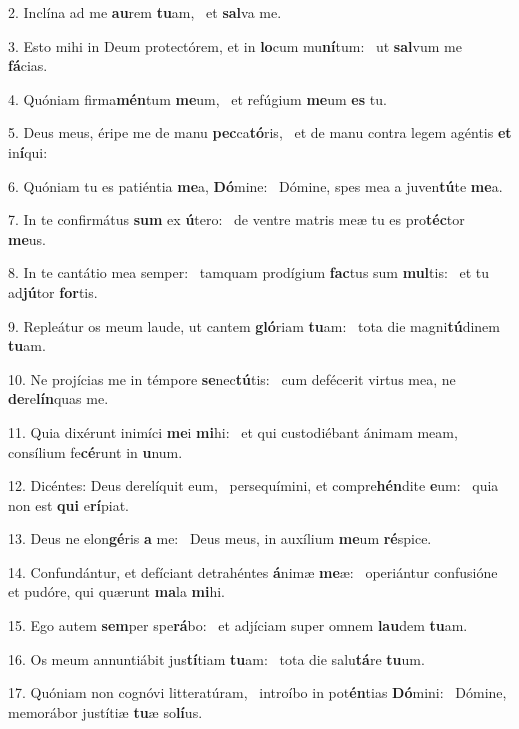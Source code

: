 2. Inclína ad me \textbf{au}rem \textbf{tu}am, \ast\  et \textbf{sal}va me.\

3. Esto mihi in Deum protectórem, et in \textbf{lo}cum mu\textbf{ní}tum: \ast\  ut \textbf{sal}vum me \textbf{fá}cias.\

4. Quóniam firma\textbf{mén}tum \textbf{me}um, \ast\  et refúgium \textbf{me}um \textbf{es} tu.\

5. Deus meus, éripe me de manu \textbf{pec}ca\textbf{tó}ris, \ast\  et de manu contra legem agéntis \textbf{et} in\textbf{í}qui:\

6. Quóniam tu es patiéntia \textbf{me}a, \textbf{Dó}mine: \ast\  Dómine, spes mea a juven\textbf{tú}te \textbf{me}a.\

7. In te confirmátus \textbf{sum} ex \textbf{ú}tero: \ast\  de ventre matris meæ tu es pro\textbf{téc}tor \textbf{me}us.\

8. In te cantátio mea semper: \dag\  tamquam prodígium \textbf{fac}tus sum \textbf{mul}tis: \ast\  et tu ad\textbf{jú}tor \textbf{for}tis.\

9. Repleátur os meum laude, ut cantem \textbf{gló}riam \textbf{tu}am: \ast\  tota die magni\textbf{tú}dinem \textbf{tu}am.\

10. Ne projícias me in témpore \textbf{se}nec\textbf{tú}tis: \ast\  cum defécerit virtus mea, ne \textbf{de}re\textbf{lín}quas me.\

11. Quia dixérunt inimíci \textbf{me}i \textbf{mi}hi: \ast\  et qui custodiébant ánimam meam, consílium fe\textbf{cé}runt in \textbf{u}num.\

12. Dicéntes: Deus derelíquit eum, \dag\  persequímini, et compre\textbf{hén}dite \textbf{e}um: \ast\  quia non est \textbf{qui} e\textbf{rí}piat.\

13. Deus ne elon\textbf{gé}ris \textbf{a} me: \ast\  Deus meus, in auxílium \textbf{me}um \textbf{ré}spice.\

14. Confundántur, et defíciant detrahéntes \textbf{á}nimæ \textbf{me}æ: \ast\  operiántur confusióne et pudóre, qui quærunt \textbf{ma}la \textbf{mi}hi.\

15. Ego autem \textbf{sem}per spe\textbf{rá}bo: \ast\  et adjíciam super omnem \textbf{lau}dem \textbf{tu}am.\

16. Os meum annuntiábit jus\textbf{tí}tiam \textbf{tu}am: \ast\  tota die salu\textbf{tá}re \textbf{tu}um.\

17. Quóniam non cognóvi litteratúram, \dag\  introíbo in pot\textbf{én}tias \textbf{Dó}mini: \ast\  Dómine, memorábor justítiæ \textbf{tu}æ so\textbf{lí}us.\

